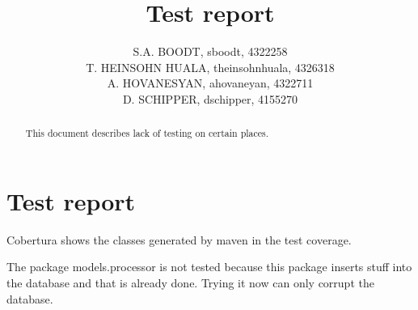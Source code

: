 \documentclass[11pt,a4paper]{report}
\author{S.A. BOODT, sboodt, 4322258\\T. HEINSOHN HUALA, theinsohnhuala, 4326318\\A. HOVANESYAN, ahovaneyan, 4322711\\D. SCHIPPER, dschipper, 4155270}
\title{Test report}
\begin{document}
\maketitle
\begin{abstract}
This document describes lack of testing on certain places.
\end{abstract}
\tableofcontents
\chapter{Test report}
Cobertura shows the classes generated by maven in the test coverage.

The package models.processor is not tested because this package inserts stuff into the database and that is already done. Trying it now can only corrupt the database.
\end{document}
